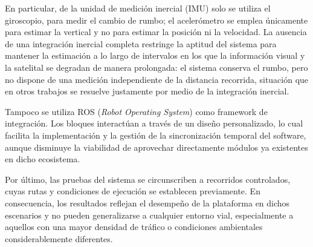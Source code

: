 En particular, de la unidad de medición inercial (IMU) solo se utiliza el giroscopio, para medir el cambio de rumbo; el acelerómetro se emplea únicamente para estimar la vertical y no para estimar la posición ni la velocidad.
La ausencia de una integración inercial completa restringe la aptitud del sistema para mantener la estimación a lo largo de intervalos en los que la información visual y la satelital se degradan de manera prolongada: el sistema conserva el rumbo, pero no dispone de una medición independiente de la distancia recorrida, situación que en otros trabajos se resuelve justamente por medio de la integración inercial.

Tampoco se utiliza ROS (\textit{Robot Operating System}) como framework de integración.
Los bloques interactúan a través de un diseño personalizado, lo cual facilita la implementación y la gestión de la sincronización temporal del software, aunque disminuye la viabilidad de aprovechar directamente módulos ya existentes en dicho ecosistema.

Por último, las pruebas del sistema se circunscriben a recorridos controlados, cuyas rutas y condiciones de ejecución se establecen previamente.
En consecuencia, los resultados reflejan el desempeño de la plataforma en dichos escenarios y no pueden generalizarse a cualquier entorno vial, especialmente a aquellos con una mayor densidad de tráfico o condiciones ambientales considerablemente diferentes.


